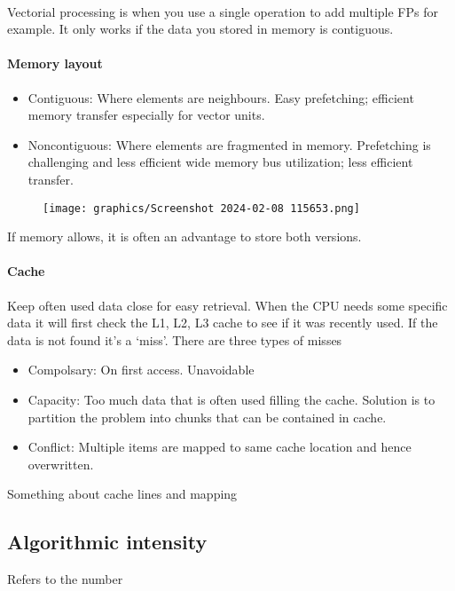 \documentclass{article}
\begin{document}
\paragraph*{} Vectorial processing is when you use a single operation to add multiple FPs for example. It only works if the data you stored in memory is contiguous.


\paragraph*{Memory layout}
\begin{itemize}
    \item Contiguous: Where elements are neighbours. Easy prefetching; efficient memory transfer especially for vector units.
    \item Noncontiguous: Where elements are fragmented in memory. Prefetching is challenging and less efficient wide memory bus utilization; less efficient transfer. 
\end{itemize}
\begin{figure}[h]
    \texttt{[image: graphics/Screenshot 2024-02-08 115653.png]}
\end{figure}

If memory allows, it is often an advantage to store both versions.
\paragraph*{Cache}
Keep often used data close for easy retrieval. When the CPU needs some specific data it will first check the L1, L2, L3 cache to see if it was recently used. If the data is not found it's a `miss'. There are three types of misses
\begin{itemize}
    \item Compolsary: On first access. Unavoidable
    \item Capacity: Too much data that is often used filling the cache. Solution is to partition the problem into chunks that can be contained in cache.
    \item Conflict: Multiple items are mapped to same cache location and hence overwritten.
\end{itemize}

Something about cache lines and mapping 
\subsection*{Algorithmic intensity}
Refers to the number
\end{document}

